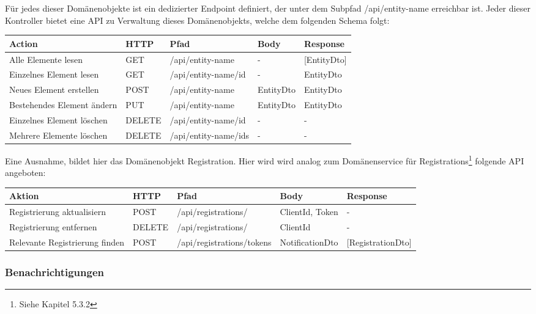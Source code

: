 Für jedes dieser Domänenobjekte ist ein dedizierter Endpoint definiert, der unter dem Subpfad /api/entity-name erreichbar ist.
Jeder dieser Kontroller bietet eine API zu Verwaltung dieses Domänenobjekts, welche dem folgenden Schema folgt:

\begin{tabular}{|p{7.3cm}|l|l|l|l|}
    \hline
    \textbf{Action} & \textbf{HTTP} & \textbf{Pfad} & \textbf{Body} & \textbf{Response} \\
    \hline
        Alle Elemente lesen         & GET & /api/entity-name & - & [EntityDto] \\
    \hline
        Einzelnes Element lesen         & GET & /api/entity-name/id & - & EntityDto \\
    \hline
        Neues Element erstellen         & POST & /api/entity-name  & EntityDto & EntityDto\\
    \hline
        Bestehendes Element ändern          & PUT & /api/entity-name  & EntityDto & EntityDto\\
    \hline
        Einzelnes Element löschen          & DELETE & /api/entity-name/id  & - & -  \\
    \hline
        Mehrere Elemente löschen          & DELETE & /api/entity-name/ids  & - & - \\
    \hline
\end{tabular}\label{tab:apimethods}

Eine Ausnahme, bildet hier das Domänenobjekt Registration.
Hier wird wird analog zum Domänenservice für Registrations\footnote{Siehe Kapitel 5.3.2} folgende API angeboten:

\begin{tabular}{|l|l|l|l|l|}
    \hline
    \textbf{Aktion} & \textbf{HTTP} & \textbf{Pfad} & \textbf{Body} & \textbf{Response} \\
    \hline
    Registrierung aktualisiern         & POST & /api/registrations/ & ClientId, Token & - \\
    \hline
    Registrierung entfernen         & DELETE & /api/registrations/ & ClientId & - \\
    \hline
    Relevante Registrierung finden         & POST & /api/registrations/tokens & NotificationDto & [RegistrationDto] \\
    \hline
\end{tabular}\label{tab:registrationsapimethods}

\subsubsection*{Benachrichtigungen}

